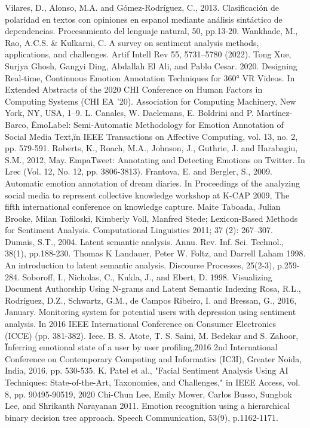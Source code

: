 \documentclass[12pt, conference]{IEEEtran}
\begin{document}
\begin{thebibliography}{00}
   Vilares, D., Alonso, M.A. and Gómez-Rodríguez, C., 2013. Clasificación de polaridad en textos con opiniones en espanol mediante análisis sintáctico de dependencias. Procesamiento del lenguaje natural, 50, pp.13-20.
   Wankhade, M., Rao, A.C.S. \& Kulkarni, C. A survey on sentiment analysis methods, applications, and challenges. Artif Intell Rev 55, 5731–5780 (2022).
   Tong Xue, Surjya Ghosh, Gangyi Ding, Abdallah El Ali, and Pablo Cesar. 2020. Designing Real-time, Continuous Emotion Annotation Techniques for 360° VR Videos. In Extended Abstracts of the 2020 CHI Conference on Human Factors in Computing Systems (CHI EA '20). Association for Computing Machinery, New York, NY, USA, 1–9.
   L. Canales, W. Daelemans, E. Boldrini and P. Martínez-Barco, \"EmoLabel: Semi-Automatic Methodology for Emotion Annotation of Social Media Text,\" in IEEE Transactions on Affective Computing, vol. 13, no. 2, pp. 579-591.
   Roberts, K., Roach, M.A., Johnson, J., Guthrie, J. and Harabagiu, S.M., 2012, May. EmpaTweet: Annotating and Detecting Emotions on Twitter. In Lrec (Vol. 12, No. 12, pp. 3806-3813).
   Frantova, E. and Bergler, S., 2009. Automatic emotion annotation of dream diaries. In Proceedings of the analyzing social media to represent collective knowledge workshop at K-CAP 2009, The fifth international conference on knowledge capture.
   Maite Taboada, Julian Brooke, Milan Tofiloski, Kimberly Voll, Manfred Stede; Lexicon-Based Methods for Sentiment Analysis. Computational Linguistics 2011; 37 (2): 267–307.
   Dumais, S.T., 2004. Latent semantic analysis. Annu. Rev. Inf. Sci. Technol., 38(1), pp.188-230.
   Thomas K Landauer, Peter W. Foltz, and Darrell Laham 1998. An introduction to latent semantic analysis. Discourse Processes, 25(2-3), p.259-284.
   Soboroff, I., Nicholas, C., Kukla, J., and Ebert, D. 1998. Visualizing Document Authorship Using N-grams and Latent Semantic Indexing
   Rosa, R.L., Rodríguez, D.Z., Schwartz, G.M., de Campos Ribeiro, I. and Bressan, G., 2016, January. Monitoring system for potential users with depression using sentiment analysis. In 2016 IEEE International Conference on Consumer Electronics (ICCE) (pp. 381-382). Ieee.
   B. S. Atote, T. S. Saini, M. Bedekar and S. Zahoor, \"Inferring emotional state of a user by user profiling,\" 2016 2nd International Conference on Contemporary Computing and Informatics (IC3I), Greater Noida, India, 2016, pp. 530-535.
   K. Patel et al., "Facial Sentiment Analysis Using AI Techniques: State-of-the-Art, Taxonomies, and Challenges," in IEEE Access, vol. 8, pp. 90495-90519, 2020
   Chi-Chun Lee, Emily Mower, Carlos Busso, Sungbok Lee, and Shrikanth Narayanan 2011. Emotion recognition using a hierarchical binary decision tree approach. Speech Communication, 53(9), p.1162-1171.
  
  

\end{thebibliography}
\end{document}
